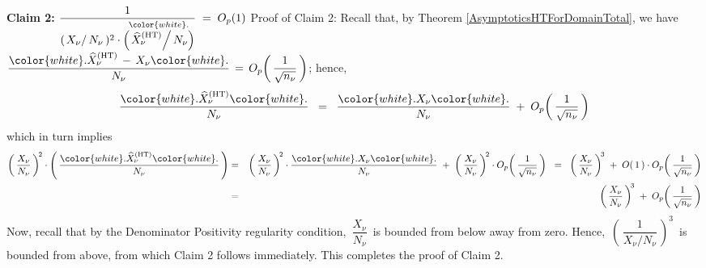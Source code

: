 \begin{enumerate}
    \vskip 0.3cm
    \noindent
    \textbf{Claim 2:}\quad
    $
    \dfrac{
        1
        }{
        (\left. X_{\nu}\right\slash N_{\nu}\,)^{2}
        \cdot
        \overset{{\color{white}.}}{
            \left(\left.\widehat{X}^{\textnormal{(HT)}}_{\nu}\right\slash N_{\nu}\right)
            }            
        }
    \; = \;
        O_{p}(1)
    $
    \vskip 0.1cm
    \noindent
    Proof of Claim 2:\;\;
    Recall that, by Theorem \ref{AsymptoticsHTForDomainTotal}, we have
    \;$
    \dfrac{
        {\color{white}.}
        \widehat{X}^{\textnormal{(HT)}}_{\nu}
        \, - \,
        X_{\nu}
        {\color{white}.}
        }{
        N_{\nu}
        }
    \, = \,
    O_{p}\!\left(\,\dfrac{1}{\sqrt{n_{\nu}}}\,\right)
    $;\;
    hence,
    \begin{equation*}
    \dfrac{
        {\color{white}.}
        \widehat{X}^{\textnormal{(HT)}}_{\nu}
        {\color{white}.}
        }{
        N_{\nu}
        }
    \;\; = \;\;
    \dfrac{
        {\color{white}.}
        X_{\nu}
        {\color{white}.}
        }{
        N_{\nu}
        }
    \; + \;
    O_{p}\!\left(\,\dfrac{1}{\sqrt{n_{\nu}}}\,\right)
    \end{equation*}
    which in turn implies
    \begin{eqnarray*}
    \left(\,
        \dfrac{X_{\nu}}{N_{\nu}}
        \,\right)^{\!2}
    \cdot
    \left(\,\dfrac{
        {\color{white}.}
        \widehat{X}^{\textnormal{(HT)}}_{\nu}
        {\color{white}.}
        }{
        N_{\nu}
        }\,\right)
    & = &
        \left(\,
            \dfrac{X_{\nu}}{N_{\nu}}
            \,\right)^{\!2}
        \cdot
        \dfrac{
            {\color{white}.}
            X_{\nu}
            {\color{white}.}
            }{
            N_{\nu}
            }
        \; + \;
        \left(\,
            \dfrac{X_{\nu}}{N_{\nu}}
            \,\right)^{\!2}
        \cdot
        O_{p}\!\left(\,\dfrac{1}{\sqrt{n_{\nu}}}\,\right)
    \;\; = \;\;
        \left(\,
            \dfrac{X_{\nu}}{N_{\nu}}
            \,\right)^{\!3}
        \; + \;
        O\!\left(\,1\,\right)
        \cdot
        O_{p}\!\left(\,\dfrac{1}{\sqrt{n_{\nu}}}\,\right)
    \\
    & = &
        \left(\,
            \dfrac{X_{\nu}}{N_{\nu}}
            \,\right)^{\!3}
        \; + \;
        O_{p}\!\left(\,\dfrac{1}{\sqrt{n_{\nu}}}\,\right)
    \end{eqnarray*}
    Now, recall that by the Denominator Positivity regularity condition,
    \,$\dfrac{X_{\nu}}{N_{\nu}}$\,
    is bounded from below away from zero.
    Hence,
    \,$\left(\,\dfrac{1}{X_{\nu} \slash N_{\nu}}\,\right)^{3}$\,
    is bounded from above, from which Claim 2 follows immediately.
    This completes the proof of Claim 2.


\end{enumerate}
